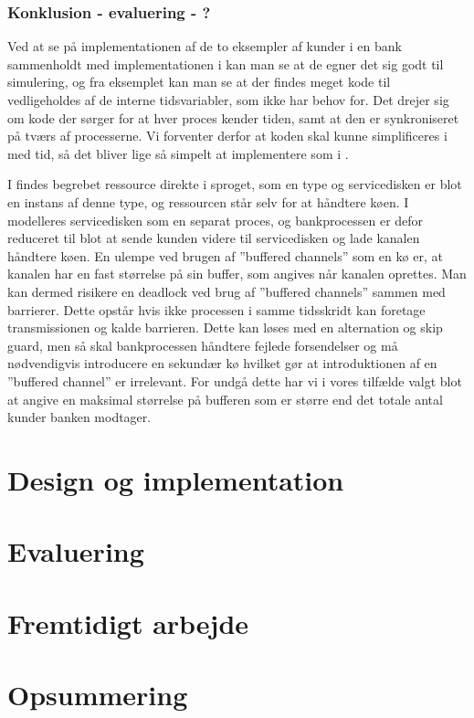 \subsubsection*{Konklusion - evaluering - ?}
Ved at se på  implementationen af de to eksempler af kunder i en bank sammenholdt med implementationen i \simpy kan man se at de egner det sig godt til 
simulering, og fra eksemplet kan man se at der findes meget kode til 
vedligeholdes af de interne tidsvariabler, som \simpy ikke har behov for. Det drejer sig 
om kode der sørger for at hver proces kender tiden, samt at den er 
synkroniseret på tværs af processerne. Vi forventer derfor at koden skal kunne 
simplificeres i \pycsp med tid, så det bliver lige så simpelt at implementere som i 
\simpy. 

I \simpy findes begrebet ressource direkte i sproget, som en type og 
servicedisken er blot en instans af denne type, og ressourcen står selv for at 
håndtere køen. I \pycsp modelleres servicedisken som en separat proces, og 
bankprocessen er defor reduceret til blot at sende kunden videre til 
servicedisken og lade kanalen håndtere køen. En ulempe ved brugen af ''buffered 
channels'' som en kø er, at kanalen har en fast størrelse på sin buffer, som 
angives når kanalen oprettes. Man kan dermed risikere en deadlock ved brug af ''buffered 
channels'' sammen med barrierer. Dette opstår hvis ikke processen i samme 
tidsskridt kan foretage transmissionen og kalde barrieren.
Dette kan løses med en alternation og skip guard, men så 
skal bankprocessen håndtere fejlede forsendelser og må nødvendigvis introducere en 
sekundær kø hvilket gør at introduktionen af en ''buffered channel'' er 
irrelevant. For undgå dette har vi i vores tilfælde valgt blot at 
angive en maksimal størrelse på bufferen som er større end det totale antal 
kunder banken modtager.

  \section{Design og implementation}
  \section{Evaluering}
  \section{Fremtidigt arbejde}
  \section{Opsummering}
